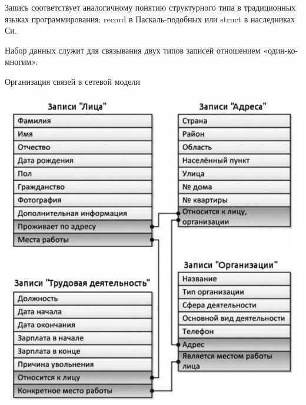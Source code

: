 \documentclass{beamer}
\begin{document}
\begin{frame}
\begin{block}{Запись}
соответствует аналогичному понятию структурного типа в традиционных языках программирования: record в Паскаль-подобных или struct в наследниках Си.
\end{block}
\begin{block}{Набор данных}
служит для связывания двух типов записей отношением «один-ко-многим».
\end{block}
\begin{block}{Организация связей в сетевой модели}
\begin{center}
\includegraphics[scale=0.25]{images/shema-04.png}
\end{center}
\end{block}
\end{frame}
\end{document}
